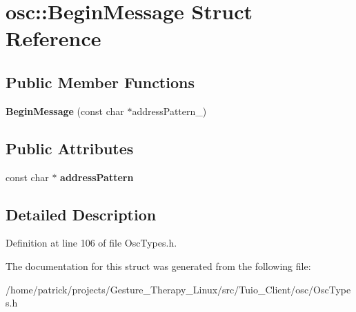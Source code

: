 \hypertarget{structosc_1_1_begin_message}{}\section{osc\+:\+:Begin\+Message Struct Reference}
\label{structosc_1_1_begin_message}
\subsection*{Public Member Functions}
\begin{DoxyCompactItemize}
\item 
\mbox{\label{structosc_1_1_begin_message_a81ac5cbcb3f408cca173d89609d22c4f}} 
{\bfseries Begin\+Message} (const char $\ast$address\+Pattern\+\_\+)
\end{DoxyCompactItemize}
\subsection*{Public Attributes}
\begin{DoxyCompactItemize}
\item 
\mbox{\label{structosc_1_1_begin_message_a2aba1ef9cd6870c575645bc9eea36195}} 
const char $\ast$ {\bfseries address\+Pattern}
\end{DoxyCompactItemize}


\subsection{Detailed Description}


Definition at line 106 of file Osc\+Types.\+h.



The documentation for this struct was generated from the following file\+:\begin{DoxyCompactItemize}
\item 
/home/patrick/projects/\+Gesture\+\_\+\+Therapy\+\_\+\+Linux/src/\+Tuio\+\_\+\+Client/osc/Osc\+Types.\+h\end{DoxyCompactItemize}
